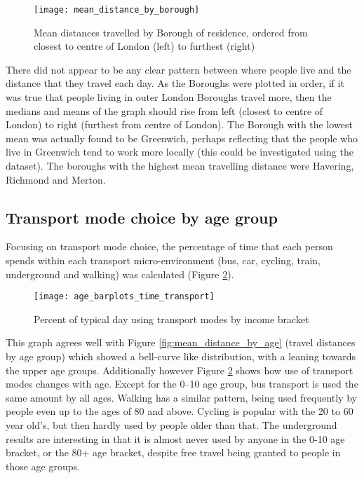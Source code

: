 \begin{landscape}

\begin{figure}[H]
\centering
\texttt{[image: mean\_distance\_by\_borough]}
\caption{Mean distances travelled by Borough of residence, ordered from closest to centre of London (left) to furthest (right)}
\label{fig:mean_distance_by_borough}
\end{figure}

\end{landscape}

There did not appear to be any clear pattern between where people live and the distance that they travel each day. As the Boroughs were plotted in order, if it was true that people living in outer London Boroughs travel more, then the medians and means of the graph should rise from left (closest to centre of London) to right (furthest from centre of London). The Borough with the lowest mean was actually found to be Greenwich, perhaps reflecting that the people who live in Greenwich tend to work more locally (this could be investigated using the dataset). The boroughs with the highest mean travelling distance were Havering, Richmond and Merton.

\subsection{Transport mode choice by age group}
\label{sec:transport_mode_choice_by_age_group}

Focusing on transport mode choice, the percentage of time that each person spends within each transport micro-environment (bus, car, cycling, train, underground and walking) was calculated (Figure \ref{fig:age_barplots_time_transport}).

\begin{figure}[H]
\centering
\texttt{[image: age\_barplots\_time\_transport]}
\caption{Percent of typical day using transport modes by income bracket}
\label{fig:age_barplots_time_transport}
\end{figure}

This graph agrees well with Figure \ref{fig:mean_distance_by_age} (travel distances by age group) which showed a bell-curve like distribution, with a leaning towards the upper age groups. Additionally however Figure \ref{fig:age_barplots_time_transport} shows how use of transport modes changes with age. Except for the 0--10 age group, bus transport is used the same amount by all ages. Walking has a similar pattern, being used frequently by people even up to the ages of 80 and above. Cycling is popular with the 20 to 60 year old's, but then hardly used by people older than that. The underground results are interesting in that it is almost never used by anyone in the 0-10 age bracket, or the 80+ age bracket, despite free travel being granted to people in those age groups.

